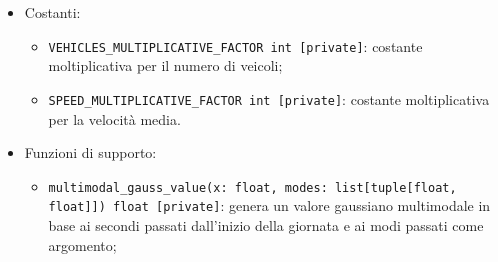 \begin{itemize}
\begin{itemize}
\begin{itemize}
        \end{itemize}
        \item Costanti:
        \begin{itemize}
            \item \texttt{VEHICLES\_MULTIPLICATIVE\_FACTOR int [private]}: costante moltiplicativa per il numero di veicoli;
            \item \texttt{SPEED\_MULTIPLICATIVE\_FACTOR int [private]}: costante moltiplicativa per la velocità media.
        \end{itemize}
        \item Funzioni di supporto:
        \begin{itemize}
            \item \texttt{multimodal\_gauss\_value(x: float, modes: list[tuple[float, float]]) float [private]}: genera un valore gaussiano multimodale in base ai secondi passati dall'inizio della giornata e ai modi passati come argomento;
        \end{itemize}
    \end{itemize}
\end{itemize}
